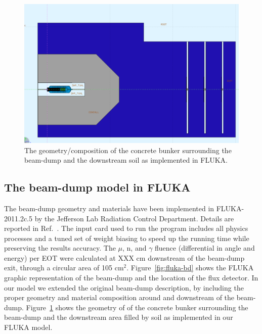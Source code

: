 \begin{figure}[h!] 
\center
\includegraphics[width=12.5cm]{figs/flukaSetup.pdf}
\caption{The geometry/composition  of the concrete bunker surrounding the beam-dump and  the downstream soil as implemented in FLUKA.}
\label{fig:fluka-bd-dwns}
\end{figure}
\subsection{The beam-dump model in FLUKA}
The beam-dump geometry and  materials have  been implemented in FLUKA-2011.2c.5 by the Jefferson Lab Radiation Control Department. Details are reported in Ref.~\cite{jnote-bd}.  The input card used to run the program  includes all physics processes and a tuned set of weight biasing to speed up the running time while preserving the  results accuracy. 
The $\mu$, n, and $\gamma$ fluence (differential in angle and energy) per EOT were  calculated   at XXX cm  downstream of the beam-dump exit, through a circular area of 105 cm$^2$. Figure~\ref{fig:fluka-bd} shows the FLUKA graphic representation of the beam-dump and the location of the flux detector.
In our model we extended the original beam-dump description, by including  
 the proper geometry and material composition around and downstream of the beam-dump.
Figure~\ref{fig:fluka-bd-dwns}  shows the geometry of of the concrete bunker surrounding the beam-dump and  the downstream area filled by soil as implemented in our FLUKA model.



